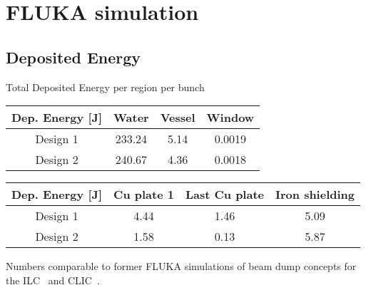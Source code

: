 \documentclass[xcolor={dvipsnames}]{beamer}
\begin{document}
\section{FLUKA simulation}

\subsection{Deposited Energy}
\begin{frame}{Total Deposited Energy per region per bunch}
\begin{center}
\begin{tabular}{|c|c|c|c|}
\hline
 Dep. Energy [J] & \textbf{Water} & \textbf{Vessel} & \textbf{Window} \\
\hline
Design 1 & 233.24 & 5.14 & 0.0019\\
\hline
\hline
Design 2 & 240.67 & 4.36 & 0.0018\\
\hline
\end{tabular}
\end{center}
\begin{center}
\begin{tabular}{|c|c|c|c|}
\hline
 Dep. Energy [J] & \textbf{Cu plate 1} & \textbf{Last Cu plate} & \textbf{Iron shielding} \\
\hline
Design 1 & 4.44 & 1.46 & 5.09\\
\hline
\hline
Design 2 & 1.58 & 0.13 & 5.87\\
\hline
\end{tabular}
\end{center}

Numbers comparable to former FLUKA simulations of beam dump concepts for the ILC~\cite{NIM_paper} and CLIC~\cite{CLIC_dump}.
\end{frame}
\end{document}
